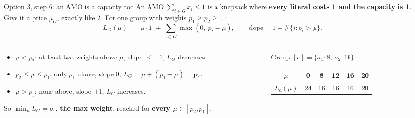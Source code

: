 \documentclass[aspectratio=169,11pt]{beamer}
\begin{document}
\begin{frame}{Option 3, step 6: an AMO is a capacity too}
\footnotesize
An AMO $\sum_{i\in G} x_i \le 1$ is a knapsack where \textbf{every literal costs 1 and the capacity is 1}. Give it a price
$\mu_G$, exactly like $\lambda$. For one group with weights $p_1 \ge p_2 \ge \dots$:
\[
L_G(\mu) \;=\; \mu\cdot 1 \;+\; \sum_{i\in G} \max(0,\ p_i - \mu), \qquad \text{slope} = 1 - \#\{i : p_i > \mu\}.
\]
\begin{columns}[T]
\begin{column}{.5\textwidth}
\begin{itemize}\setlength\itemsep{2pt}
\item $\mu < p_2$: at least two weights above $\mu$, slope $\le -1$, $L_G$ decreases.
\item $p_2 \le \mu \le p_1$: only $p_1$ above, slope $0$, $L_G = \mu + (p_1 - \mu) = \mathbf{p_1}$.
\item $\mu > p_1$: none above, slope $+1$, $L_G$ increases.
\end{itemize}
\vspace{1mm}
So $\min_\mu L_G = p_1$, \textbf{the max weight}, reached for \textbf{every $\mu \in [p_2, p_1]$}.
\end{column}
\begin{column}{.48\textwidth}
\centering
Group $[a] = \{a_1{:}8,\ a_2{:}16\}$:\\[1mm]
\begin{tabular}{c|ccccc}
$\mu$ & 0 & 8 & 12 & 16 & 20\\\hline
$L_a(\mu)$ & 24 & 16 & 16 & 16 & 20
\end{tabular}\\[2mm]
\end{column}
\end{columns}
\end{frame}
\end{document}
